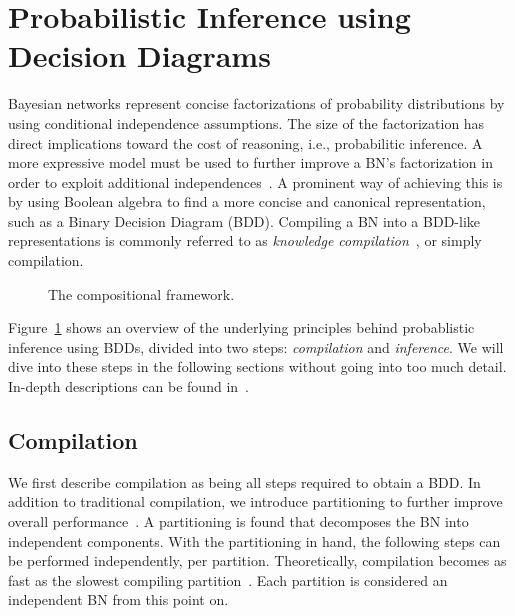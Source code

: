 
\section{Probabilistic Inference using Decision Diagrams}\label{sec:parallel}


Bayesian networks represent concise factorizations of probability distributions by using conditional independence assumptions. The size of the factorization has direct implications toward the cost of reasoning, i.e., probabilitic inference. A more expressive model must be used to further improve a BN's factorization in order to exploit additional independences~\cite{boutilier1996context,friedman1998learning,zhang1996exploiting}. A prominent way of achieving this is by using Boolean algebra to find a more concise and canonical representation, such as a Binary Decision Diagram (BDD). Compiling a BN into a BDD-like representations is commonly referred to as \emph{knowledge compilation}~\cite{darwiche2002knowledge}, or simply compilation.

\begin{figure}[!t]
    \centering
    \scalebox{0.9}{
        
    }
    \caption{The compositional framework.}
    \label{fig:frameworkoverview}
\end{figure}


Figure~\ref{fig:frameworkoverview} shows an overview of the underlying principles behind probablistic inference using BDDs, divided into two steps: \emph{compilation} and \emph{inference}. We will dive into these steps in the following sections without going into too much detail. In-depth descriptions can be found in~\cite{dal2021compositional}.

\subsection{Compilation}

We first describe compilation as being all steps required to obtain a BDD. In addition to traditional compilation, we introduce partitioning to further improve overall performance~\cite{dal2017reducing}. A partitioning is found that decomposes the BN into independent components. With the partitioning in hand, the following steps can be performed independently, per partition. Theoretically, compilation becomes as fast as the slowest compiling partition~\cite{dal2018parallel}. Each partition is considered an independent BN from this point on.

